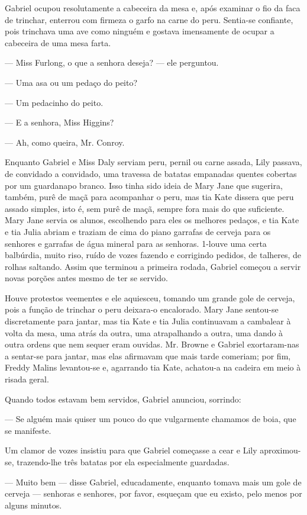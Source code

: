 Gabriel ocupou resolutamente a cabeceira da mesa e, após examinar o
fio da faca de trinchar, enterrou com firmeza o garfo na carne do
peru. Sentia-se confiante, pois trinchava uma ave como ninguém e
gostava imensamente de ocupar a cabeceira de uma mesa farta.

--- Miss Furlong, o que a senhora deseja? --- ele perguntou.

--- Uma asa ou um pedaço do peito?

--- Um pedacinho do peito.

--- E a senhora, Miss Higgins?

--- Ah, como queira, Mr. Conroy.

Enquanto Gabriel e Miss Daly serviam peru, pernil ou carne assada,
Lily passava, de convidado a convidado, uma travessa de batatas
empanadas quentes cobertas por um guardanapo branco. Isso tinha sido
ideia de Mary Jane que sugerira, também, purê de maçã para acompanhar
o peru, mas tia Kate dissera que peru assado simples, isto é, sem purê
de maçã, sempre fora mais do que suficiente. Mary Jane servia os
alunos, escolhendo para eles os melhores pedaços, e tia Kate e tia
Julia abriam e traziam de cima do piano garrafas de cerveja para os
senhores e garrafas de água mineral para as senhoras. 1-louve uma
certa balbúrdia, muito riso, ruído de vozes fazendo e corrigindo
pedidos, de talheres, de rolhas saltando. Assim que terminou a
primeira rodada, Gabriel começou a servir novas porções antes mesmo de
ter se servido.

Houve protestos veementes e ele aquiesceu, tomando um grande gole de
cerveja, pois a função de trinchar o peru deixara-o encalorado. Mary
Jane sentou-se discretamente para jantar, mas tia Kate e tia Julia
continuavam a cambalear à volta da mesa, uma atrás da outra, uma
atrapalhando a outra, uma dando à outra ordens que nem sequer eram
ouvidas. Mr. Browne e Gabriel exortaram-nas a sentar-se para jantar,
mas elas afirmavam que mais tarde comeriam; por fim, Freddy Malins
levantou-se e, agarrando tia Kate, achatou-a na cadeira em meio à
risada geral.

Quando todos estavam bem servidos, Gabriel anunciou, sorrindo:

--- Se alguém mais quiser um pouco do que vulgarmente chamamos de
boia, que se manifeste.

Um clamor de vozes insistiu para que Gabriel começasse a cear e Lily
aproximou-se, trazendo-lhe três batatas por ela especialmente
guardadas.

--- Muito bem --- disse Gabriel, educadamente, enquanto tomava mais
um gole de cerveja --- senhoras e senhores, por favor, esqueçam que eu
existo, pelo menos por alguns minutos.

